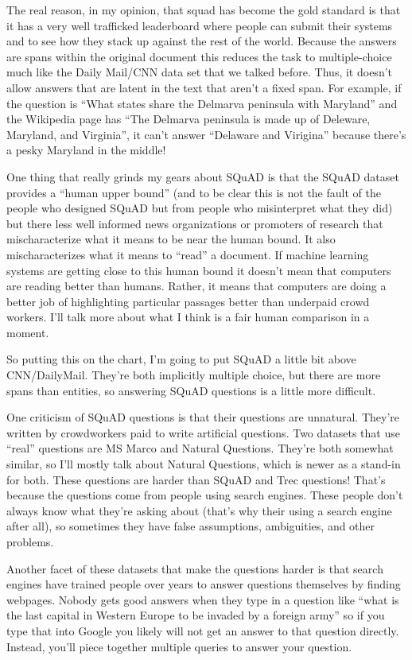 The real reason, in my opinion, that squad has become the gold standard is that it has a very well trafficked leaderboard where people can submit their systems and to see how they stack up against the rest of the world.  Because the answers are spans within the original document this reduces the task to multiple-choice much like the Daily Mail/CNN data set that we talked before.  Thus, it doesn't allow answers that are latent in the text that aren’t a fixed span.  For example, if the question is “What states share the Delmarva peninsula with Maryland” and the Wikipedia page has “The Delmarva peninsula is made up of Deleware, Maryland, and Virginia”, it can’t answer “Delaware and Virigina” because there’s a pesky Maryland in the middle!

One thing that really grinds my gears about SQuAD is that the SQuAD dataset provides a “human upper bound” (and to be clear this is not the fault of the people who designed SQuAD but from people who misinterpret what they did) but there less well informed news organizations or promoters of research that mischaracterize what it means to be near the human bound.  It also mischaracterizes what it means to “read” a document.  If machine learning systems are getting close to this human bound it doesn't mean that computers are reading better than humans.  Rather, it means that computers are doing a better job of highlighting particular passages better than underpaid crowd workers.  I’ll talk more about what I think is a fair human comparison in a moment.

So putting this on the chart, I’m going to put SQuAD a little bit above CNN/DailyMail.  They’re both implicitly multiple choice, but there are more spans than entities, so answering SQuAD questions is a little more difficult.

One criticism of SQuAD questions is that their questions are unnatural.  They’re written by crowdworkers paid to write artificial questions.  Two datasets that use “real” questions are MS Marco and Natural Questions.  They’re both somewhat similar, so I’ll mostly talk about Natural Questions, which is newer as a stand-in for both.  These questions are harder than SQuAD and Trec questions!  That’s because the questions come from people using search engines.  These people don’t always know what they’re asking about (that’s why their using a search engine after all), so sometimes they have false assumptions, ambiguities, and other problems.  

Another facet of these datasets that make the questions harder is that search engines have trained people over years to answer questions themselves by finding webpages.  Nobody gets good answers when they type in a question like “what is the last capital in Western Europe to be invaded by a foreign army” so if you type that into Google you likely will not get an answer to that question directly.  Instead, you’ll piece together multiple queries to answer your question.

